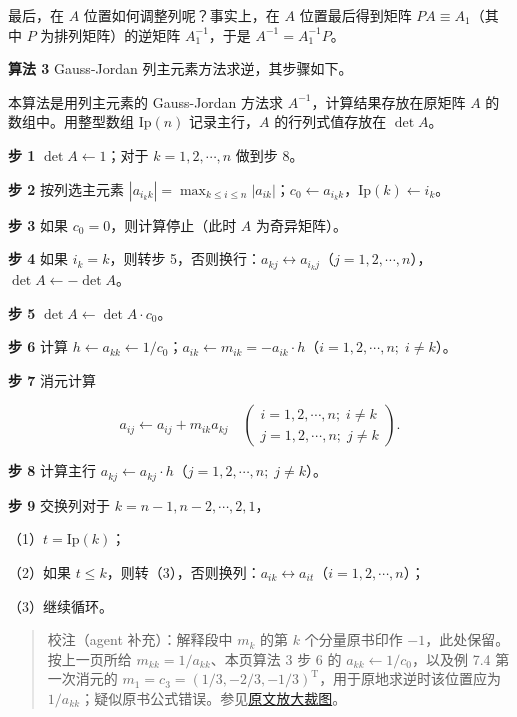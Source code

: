 最后，在 \(A\) 位置如何调整列呢？事实上，在 \(A\) 位置最后得到矩阵 \(PA\equiv A_1\)（其中 \(P\) 为排列矩阵）的逆矩阵 \(A_1^{-1}\)，于是 \(A^{-1}=A_1^{-1}P\)。

\textbf{算法 3} Gauss-Jordan 列主元素方法求逆，其步骤如下。

本算法是用列主元素的 Gauss-Jordan 方法求 \(A^{-1}\)，计算结果存放在原矩阵 \(A\) 的数组中。用整型数组 \(\mathrm{Ip}(n)\) 记录主行，\(A\) 的行列式值存放在 \(\det A\)。

\textbf{步 1} \(\det A\leftarrow1\)；对于 \(k=1,2,\cdots,n\) 做到步 8。

\textbf{步 2} 按列选主元素 \(|a_{i_kk}|=\max_{k\le i\le n}|a_{ik}|\)；\(c_0\leftarrow a_{i_kk}\)，\(\mathrm{Ip}(k)\leftarrow i_k\)。

\textbf{步 3} 如果 \(c_0=0\)，则计算停止（此时 \(A\) 为奇异矩阵）。

\textbf{步 4} 如果 \(i_k=k\)，则转步 5，否则换行：\(a_{kj}\leftrightarrow a_{i_kj}\)（\(j=1,2,\cdots,n\)），\(\det A\leftarrow-\det A\)。

\textbf{步 5} \(\det A\leftarrow\det A\cdot c_0\)。

\textbf{步 6} 计算 \(h\leftarrow a_{kk}\leftarrow1/c_0\)；\(a_{ik}\leftarrow m_{ik}=-a_{ik}\cdot h\)（\(i=1,2,\cdots,n;\;i\ne k\)）。

\textbf{步 7} 消元计算

\[a_{ij}\leftarrow a_{ij}+m_{ik}a_{kj}\quad
\left(\begin{array}{l}i=1,2,\cdots,n;\;i\ne k\\j=1,2,\cdots,n;\;j\ne k\end{array}\right).\]

\textbf{步 8} 计算主行 \(a_{kj}\leftarrow a_{kj}\cdot h\)（\(j=1,2,\cdots,n;\;j\ne k\)）。

\textbf{步 9} 交换列对于 \(k=n-1,n-2,\cdots,2,1\)，

（1）\(t=\mathrm{Ip}(k)\)；

（2）如果 \(t\le k\)，则转（3），否则换列：\(a_{ik}\leftrightarrow a_{it}\)（\(i=1,2,\cdots,n\)）；

（3）继续循环。

\begin{quote}
校注（agent 补充）：解释段中 \(m_k\) 的第 \(k\) 个分量原书印作 \(-1\)，此处保留。按上一页所给 \(m_{kk}=1/a_{kk}\)、本页算法 3 步 6 的 \(a_{kk}\leftarrow1/c_0\)，以及例 7.4 第一次消元的 \(m_1=c_3=(1/3,-2/3,-1/3)^{\mathrm T}\)，用于原地求逆时该位置应为 \(1/a_{kk}\)；疑似原书公式错误。参见\href{verified/assets/ch07a/pdf-190-multiplier-detail.png}{原文放大裁图}。
\end{quote}

